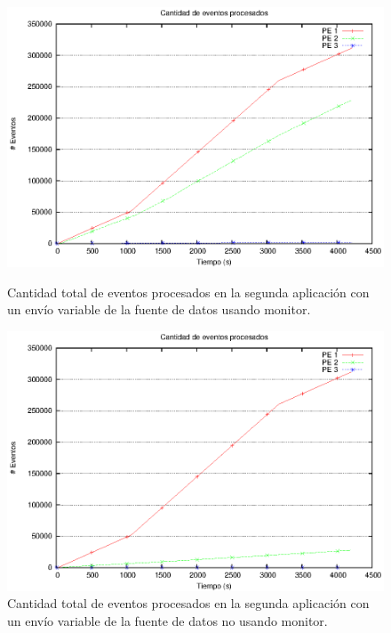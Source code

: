 \begin{figure}[ht]
\centering

\begin{minipage}[c]{0.45\textwidth}
\centering
    \includegraphics[width=\textwidth]{images/exp/app2/normal/cm/eventCount.eps}
    \caption{Cantidad total de eventos procesados en la segunda aplicación con un envío variable de la fuente de datos usando monitor.}
    \label{fig:app2-normal-eventCount-cm}
\end{minipage} \hspace*{1cm}
\begin{minipage}[c]{0.45\textwidth}
\centering
    \includegraphics[width=\textwidth]{images/exp/app2/normal/sm/eventCount.eps}
    \caption{Cantidad total de eventos procesados en la segunda aplicación con un envío variable de la fuente de datos no usando monitor.}
    \label{fig:app2-normal-eventCount-sm}
\end{minipage}

\end{figure}

